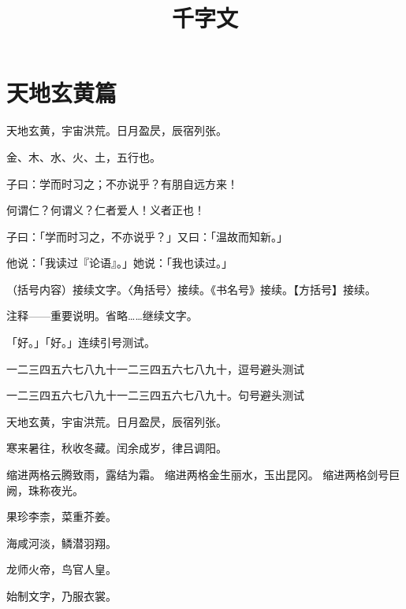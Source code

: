 \documentclass{ltc-cn-vbook}
\begin{document}
\title{千字文}
\chapter{天地玄黄篇}

\begin{正文}

天地玄黄，宇宙洪荒。日月盈昃，辰宿列张。

金、木、水、火、土，五行也。

子曰：学而时习之；不亦说乎？有朋自远方来！

何谓仁？何谓义？仁者爱人！义者正也！

子曰：「学而时习之，不亦说乎？」又曰：「温故而知新。」

他说：「我读过『论语』。」她说：「我也读过。」

（括号内容）接续文字。〈角括号〉接续。《书名号》接续。【方括号】接续。

注释——重要说明。省略……继续文字。

「好。」「好。」连续引号测试。

一二三四五六七八九十一二三四五六七八九十，逗号避头测试

一二三四五六七八九十一二三四五六七八九十。句号避头测试

\end{正文}

\newpage

\begin{正文}

天地玄黄，宇宙洪荒。日月盈昃，辰宿列张。

\begin{段落}[indent=2]
寒来暑往，秋收冬藏。闰余成岁，律吕调阳。
\end{段落}

\begin{段落}[indent=2]
缩进两格 云腾致雨，露结为霜。
缩进两格 金生丽水，玉出昆冈。
缩进两格 剑号巨阙，珠称夜光。
\end{段落}

果珍李柰， 菜重芥姜。

海咸河淡， 鳞潜羽翔。

龙师火帝，鸟官人皇。

始制 文字，乃服衣裳。

\end{正文}
\end{document}
